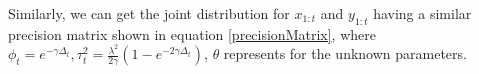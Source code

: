 Similarly, we can get the joint distribution for $x_{1:t}$ and $y_{1:t}$ 
having a similar precision matrix shown in equation \eqref{precisionMatrix}, where $\phi_t = e^{-\gamma\Delta_t}, \tau^2_t = \frac{\lambda^2}{2\gamma}\left(1-e^{-2\gamma\Delta_t}\right)$, $\theta$ represents for the unknown parameters. 



